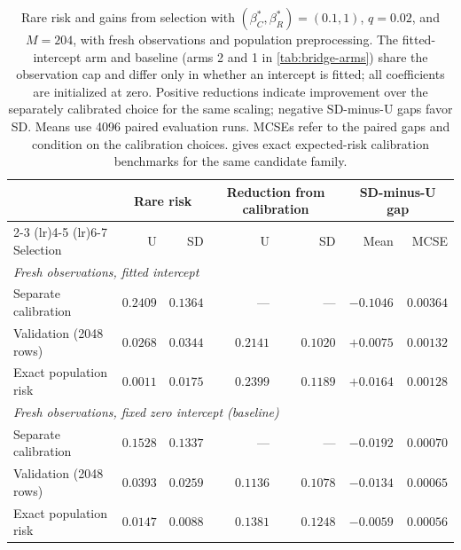 \documentclass{alt2027}
\begin{document}
\begin{table}[t]
  \centering
  \begin{tabular}{lrrrrrr}
    \toprule
                           & \multicolumn{2}{c}{Rare risk} & \multicolumn{2}{c}{Reduction from calibration} & \multicolumn{2}{c}{SD-minus-U gap} \\
    \cmidrule(lr){2-3} \cmidrule(lr){4-5} \cmidrule(lr){6-7}
    Selection              &        U &       SD &        U &       SD &      Mean &      MCSE \\
    \midrule
    \multicolumn{7}{l}{\emph{Fresh observations, fitted intercept}}                            \\
    Separate calibration   & $0.2409$ & $0.1364$ &      --- &      --- & $-0.1046$ & $0.00364$ \\
    Validation (2048 rows) & $0.0268$ & $0.0344$ & $0.2141$ & $0.1020$ & $+0.0075$ & $0.00132$ \\
    Exact population risk  & $0.0011$ & $0.0175$ & $0.2399$ & $0.1189$ & $+0.0164$ & $0.00128$ \\
    \midrule
    \multicolumn{7}{l}{\emph{Fresh observations, fixed zero intercept (baseline)}}             \\
    Separate calibration   & $0.1528$ & $0.1337$ &      --- &      --- & $-0.0192$ & $0.00070$ \\
    Validation (2048 rows) & $0.0393$ & $0.0259$ & $0.1136$ & $0.1078$ & $-0.0134$ & $0.00065$ \\
    Exact population risk  & $0.0147$ & $0.0088$ & $0.1381$ & $0.1248$ & $-0.0059$ & $0.00056$ \\
    \bottomrule
  \end{tabular}
  \caption{
    Rare risk and gains from selection with $(\beta_C^*,\beta_R^*) = (0.1,1)$,
    $q = 0.02$, and $M = 204$, with fresh observations and population
    preprocessing. The fitted-intercept arm and baseline (arms 2 and 1 in
    \cref{tab:bridge-arms}) share the observation cap and differ only in whether
    an intercept is fitted; all coefficients are initialized at zero. Positive
    reductions indicate improvement over the separately calibrated choice for
    the same scaling; negative SD-minus-U gaps favor SD\@. Means use 4096 paired
    evaluation runs. MCSEs refer to the paired gaps and condition on the
    calibration choices.  gives exact
    expected-risk calibration benchmarks for the same candidate family.
  }
  \label{tab:bridge-selection}
\end{table}
\end{document}
